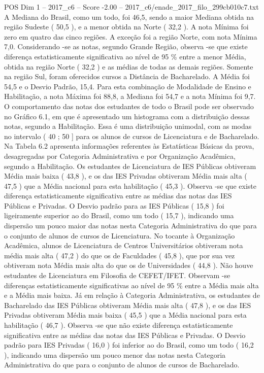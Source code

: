 \begin{textsample}{POS Dim 1 – 2017\_c6 – Score -2.00 – 2017\_c6/enade\_2017\_filo\_299cb010c7.txt}
A Mediana do Brasil, como um todo, foi 46,5, sendo a maior Mediana obtida na região Sudeste ( 50,5 ), e a menor obtida na Norte ( 32,2 ).
A nota Mínima foi zero em quatro das cinco regiões.
A exceção foi a região Norte, com nota Mínima 7,0.
Considerando -se as notas, segundo Grande Região, observa -se que existe diferença estatisticamente significativa ao nível de 95 \% entre a menor Média, obtida na região Norte ( 32,2 ) e as médias de todas as demais regiões.
Somente na região Sul, foram oferecidos cursos a Distância de Bacharelado.
A Média foi 54,5 e o Desvio Padrão, 15,4.
Para esta combinação de Modalidade de Ensino e Habilitação, a nota Máxima foi 88,8, a Mediana foi 54,7 e a nota Mínima foi 9,7.
O comportamento das notas dos estudantes de todo o Brasil pode ser observado no Gráfico 6.1, em que é apresentado um histograma com a distribuição dessas notas, segundo a Habilitação.
Essa é uma distribuição unimodal, com as modas no intervalo ( 40 ; 50 ] para os alunos de cursos de Licenciatura e de Bacharelado.
Na Tabela 6.2 apresenta informações referentes às Estatísticas Básicas da prova, desagregadas por Categoria Administrativa e por Organização Acadêmica, segundo a Habilitação.
Os estudantes de Licenciatura de IES Públicas obtiveram Média mais baixa ( 43,8 ), e os das IES Privadas obtiveram Média mais alta ( 47,5 ) que a Média nacional para esta habilitação ( 45,3 ).
Observa -se que existe diferença estatisticamente significativa entre as médias das notas das IES Públicas e Privadas.
O Desvio padrão para as IES Públicas ( 15,8 ) foi ligeiramente superior ao do Brasil, como um todo ( 15,7 ), indicando uma dispersão um pouco maior das notas nesta Categoria Administrativa do que para o conjunto de alunos de cursos de Licenciatura.
No tocante à Organização Acadêmica, alunos de Licenciatura de Centros Universitários obtiveram nota média mais alta ( 47,2 ) do que os de Faculdades ( 45,8 ), que por sua vez obtiveram nota Média mais alta do que os de Universidades ( 44,8 ).
Não houve estudantes de Licenciatura em Filosofia de CEFET/IFET.
Observam -se diferenças estatisticamente significativas ao nível de 95 \% entre a Média mais alta e a Média mais baixa.
Já em relação à Categoria Administrativa, os estudantes de Bacharelado das IES Públicas obtiveram Média mais alta ( 47,8 ), e os das IES Privadas obtiveram Média mais baixa ( 45,5 ) que a Média nacional para esta habilitação ( 46,7 ).
Observa -se que não existe diferença estatisticamente significativa entre as médias das notas das IES Públicas e Privadas.
O Desvio padrão para IES Privadas ( 16,0 ) foi inferior ao do Brasil, como um todo ( 16,2 ), indicando uma dispersão um pouco menor das notas nesta Categoria Administrativa do que para o conjunto de alunos de cursos de Bacharelado.

\end{textsample}
